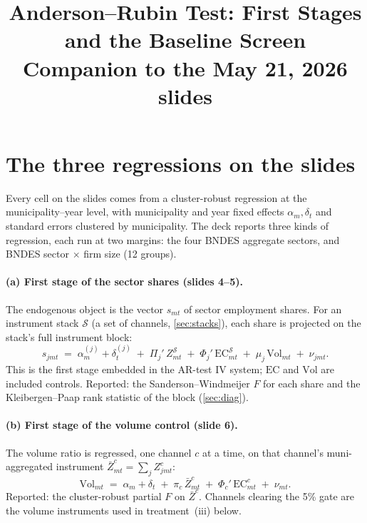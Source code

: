 \documentclass{article}
\newcommand{\EC}{\mathrm{EC}}
\newcommand{\Vol}{\mathrm{Vol}}
\newcommand{\Zbar}{\bar Z}
\newcommand{\cS}{\mathcal{S}}
\begin{document}
\title{Anderson--Rubin Test: First Stages and the Baseline Screen\\[2pt]
       \large Companion to the May 21, 2026 slides}
\author{}
\date{}
\maketitle

\setlength{\parskip}{6pt}
\setlength{\parindent}{12pt}

\section{The three regressions on the slides}\label{sec:eq}

Every cell on the slides comes from a cluster-robust regression at the
municipality--year level, with municipality and year fixed effects
$\alpha_m,\delta_t$ and standard errors clustered by municipality. The deck
reports three kinds of regression, each run at two margins: the four BNDES
aggregate sectors, and BNDES sector $\times$ firm size (12 groups).

\paragraph{(a) First stage of the sector shares (slides 4--5).}
The endogenous object is the vector $s_{mt}$ of sector employment shares. For an
instrument stack $\cS$ (a set of channels, \autoref{sec:stacks}), each share is
projected on the stack's full instrument block:
\begin{equation}\label{eq:fs-shares}
  s_{jmt}
  \;=\;
  \alpha^{(j)}_m + \delta^{(j)}_t
  \;+\; \Pi_j'\,Z^{\cS}_{mt}
  \;+\; \Phi_j'\,\EC^{\cS}_{mt}
  \;+\; \mu_j\,\Vol_{mt}
  \;+\; \nu_{jmt}.
\end{equation}
This is the first stage embedded in the AR-test IV system; $\EC$ and $\Vol$
are included controls. Reported: the Sanderson--Windmeijer $F$ for each share
and the Kleibergen--Paap rank statistic of the block (\autoref{sec:diag}).

\paragraph{(b) First stage of the volume control (slide 6).}
The volume ratio is regressed, one channel $c$ at a time, on that channel's
muni-aggregated instrument $\Zbar^{c}_{mt}=\sum_j Z^{c}_{jmt}$:
\begin{equation}\label{eq:fs-vol}
  \Vol_{mt}
  \;=\;
  \alpha_m + \delta_t
  \;+\; \pi_c\,\Zbar^{c}_{mt}
  \;+\; \Phi_c'\,\EC^{c}_{mt}
  \;+\; \nu_{mt}.
\end{equation}
Reported: the cluster-robust partial $F$ on $\Zbar^{c}$. Channels clearing the
5\% gate are the volume instruments used in treatment~(iii) below.
\end{document}
